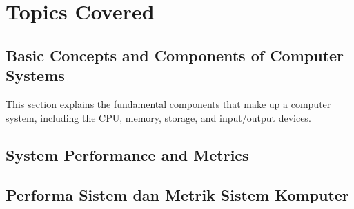 \documentclass[12pt]{article}
\begin{document}
\section{Topics Covered}

\subsection{Basic Concepts and Components of Computer Systems}
This section explains the fundamental components that make up a computer system, including the CPU, memory, storage, and input/output devices.

\subsection{System Performance and Metrics}
\subsection{Performa Sistem dan Metrik Sistem Komputer}
\end{document}

